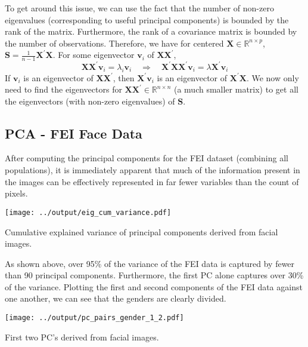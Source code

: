 \documentclass{article}
\newcommand{\tck}{^{\prime}}
\newcommand{\qaq}[0]{\quad\Rightarrow\quad}
\begin{document}
\begin{multicols}{2}
  To get around this issue, we can use the fact that the number of non-zero eigenvalues (corresponding to useful principal components) is bounded by the rank of the matrix. Furthermore, the rank of a covariance matrix is bounded by the number of observations. Therefore, we have for centered $\bm{X}\in\mathbb{R}^{n\times p}$, $\bm{S} = \frac{1}{n-1}\bm{X}\tck\bm{X}$. For some eigenvector $\bm{v}_i$ of $\bm{X}\bm{X}\tck$,
    $$
      \bm{X}\bm{X}\tck\bm{v}_i = \lambda_i\bm{v}_i
\qaq      \bm{X}\tck\bm{X}\bm{X}\tck\bm{v}_i = \lambda \bm{X}\tck\bm{v}_i
    $$
    If $\bm{v}_i$ is an eigenvector of $\bm{X}\bm{X}\tck$, then $\bm{X}\tck\bm{v}_i$ is an eigenvector of $\bm{X}\tck\bm{X}$. We now only need to find the eigenvectors for $\bm{X}\bm{X}\tck\in\mathbb{R}^{n\times n}$ (a much smaller matrix) to get all the eigenvectors (with non-zero eigenvalues) of $\bm{S}$.
    
  \subsection{PCA - FEI Face Data}
  
  After computing the principal components for the FEI dataset (combining all populations), it is immediately apparent that much of the information present in the images can be effectively represented in far fewer variables than the count of pixels.
  
  \noindent
  \begin{minipage}{\columnwidth}
    \makeatletter
    \newcommand{\@captype}{figure}
    \makeatother
    \centering
    \texttt{[image: ../output/eig\_cum\_variance.pdf]}
    \caption{Cumulative explained variance of principal components derived from facial images.}
  \end{minipage}
  
  \vspace{1em}
    As shown above, over 95\% of the variance of the FEI data is captured by fewer than 90 principal components. Furthermore, the first PC alone captures over 30\% of the variance. Plotting the first and second components of the FEI data against one another, we can see that the genders are clearly divided.
  
  \noindent
  \begin{minipage}{\columnwidth}
    \makeatletter
    \newcommand{\@captype}{figure}
    \makeatother
    \centering
    \texttt{[image: ../output/pc\_pairs\_gender\_1\_2.pdf]}
    \caption{First two PC's derived from facial images.}
  \end{minipage}


\end{multicols}
\end{document}
